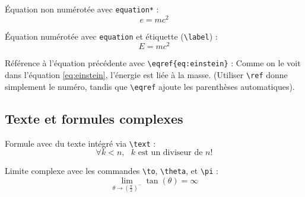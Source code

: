 \documentclass{article}
\begin{document}
Équation non numérotée avec \texttt{equation*} :
\begin{equation*}
    e = mc^2
\end{equation*}

Équation numérotée avec \texttt{equation} et étiquette (\verb|\label|) :
\begin{equation}
    \label{eq:einstein}
    E = mc^2
\end{equation}

Référence à l'équation précédente avec \verb|\eqref{eq:einstein}| : 
Comme on le voit dans l'équation \eqref{eq:einstein}, l'énergie est liée à la masse. 
(Utiliser \verb|\ref| donne simplement le numéro, tandis que \verb|\eqref| ajoute les parenthèses automatiques).

\subsection{Texte et formules complexes}

Formule avec du texte intégré via \verb|\text| :
\begin{equation*}
    \forall k < n, \text{ $k$ est un diviseur de } n!
\end{equation*}

Limite complexe avec les commandes \verb|\to|, \verb|\theta|, et \verb|\pi| :
\begin{equation*}
    \lim_{\theta \to \left(\frac{\pi}{2}\right)^-} \tan(\theta) = \infty
\end{equation*}
\end{document}
